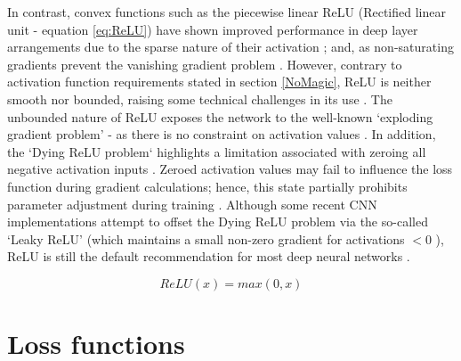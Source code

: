 In contrast, convex functions such as the piecewise linear ReLU (Rectified linear unit - equation \ref{eq:ReLU}) have shown improved performance in deep layer arrangements due to the sparse nature of their activation \cite{Krizhevsky2012}; and, as non-saturating gradients prevent the vanishing gradient problem \cite{Lundervold2019}. However, contrary to activation function requirements stated in section \ref{NoMagic}, ReLU is neither smooth nor bounded, raising some technical challenges in its use \cite{Lundervold2019}. The unbounded nature of ReLU exposes the network to the well-known `exploding gradient problem' - as there is no constraint on activation values \cite{xu2015}. In addition, the `Dying ReLU problem` highlights a limitation associated with zeroing all negative activation inputs \cite{xu2015}. Zeroed activation values may fail to influence the loss function during gradient calculations; hence, this state partially prohibits parameter adjustment during training \cite{xu2015}. Although some recent CNN implementations attempt to offset the Dying ReLU problem via the so-called `Leaky ReLU' (which maintains a small non-zero gradient for activations $< 0$ \cite{Maas2013}), ReLU is still the default recommendation for most deep neural networks \cite{Goodfellow2016}.

\begin{equation}
ReLU(x) = max(0,x)
\label{eq:ReLU}
\end{equation}


\section{Loss functions}



